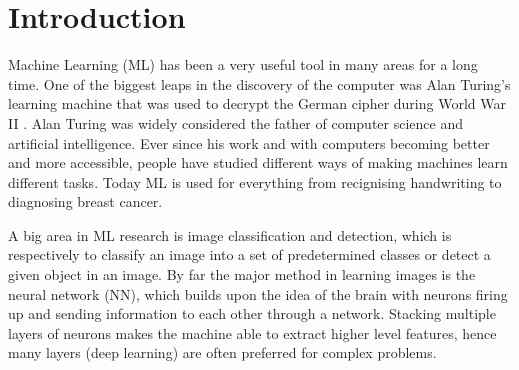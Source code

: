 \section{Introduction}

Machine Learning (ML) has been a very useful tool in many areas for a long time. One of the biggest leaps in the discovery of the computer was Alan Turing's learning machine that was used to decrypt the German cipher during World War II \cite{Turing}. Alan Turing was widely considered the father of computer science and artificial intelligence\cite{Beavers2013}. Ever since his work and with computers becoming better and more accessible, people have studied different ways of making machines learn different tasks. Today ML is used for everything from recignising handwriting to diagnosing breast cancer\cite{Khuriwal2018}. 

A big area in ML research is image classification and detection, which is respectively to classify an image into a set of predetermined classes or detect a given object in an image. By far the major method in learning images is the neural network (NN), which builds upon the idea of the brain with neurons firing up and sending information to each other through a network. Stacking multiple layers of neurons makes the machine able to extract higher level features, hence many layers (deep learning) are often preferred for complex problems. 